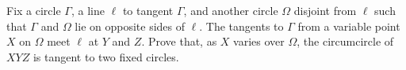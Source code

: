 Fix a circle $\Gamma$, a line $\ell$ to tangent $\Gamma$, and another circle $\Omega$ disjoint from $\ell$ such that $\Gamma$ and $\Omega$ lie on opposite sides of $\ell$. The tangents to $\Gamma$ from a variable point $X$ on $\Omega$ meet $\ell$ at $Y$ and $Z$. Prove that, as $X$ varies over $\Omega$, the circumcircle of $XYZ$ is tangent to two fixed circles.
